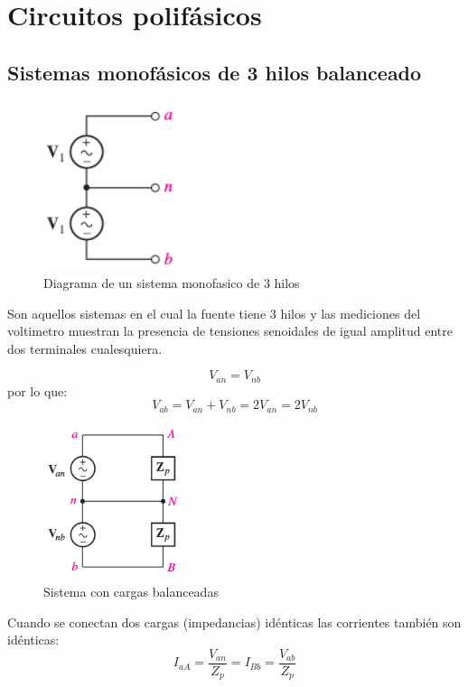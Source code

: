 \documentclass[11pt]{article}
\begin{document}
\section{Circuitos polifásicos}
\label{sec:orgheadline8}
\subsection{Sistemas monofásicos de 3 hilos balanceado}
\label{sec:orgheadline4}
\begin{figure}
\centering
\includegraphics[width=4cm]{data/8e/bfa3bf-b466-4403-8824-a12d81b26121/screenshot-20151103-204646.png}
\caption{Diagrama de un sistema monofasico de 3 hilos}
\end{figure}

Son aquellos sistemas en el cual la fuente tiene 3 hilos y las
mediciones del voltimetro muestran la presencia de tensiones
senoidales de igual amplitud entre dos terminales cualesquiera.

$$V_{an}=V_{nb}$$
por lo que:
$$V_{ab}=V_{an}+V_{nb}=2V_{an}=2V_{nb}$$
$$$$$$$$$$$$

\begin{figure}
\centering
\includegraphics[width=4cm]{data/8e/bfa3bf-b466-4403-8824-a12d81b26121/screenshot-20151021-015512.png}
\caption{Sistema con cargas balanceadas}
\end{figure}

Cuando se conectan dos cargas (impedancias) idénticas las corrientes
también son idénticas:
$$I_{aA}=\frac{V_{an}}{Z_p}=I_{Bb}=\frac{V_{ab}}{Z_{p}}$$
\end{document}
